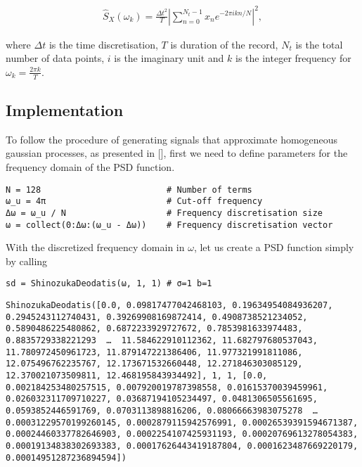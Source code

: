 \begin{equation*}
\begin{split}    \hat{S}_X(\omega_k) = \frac{\Delta t^2}{T} \left| \sum \limits_{n = 0}^{N_t-1} x_n e^{-2 \pi i k n / N} \right|^2,\end{split}\end{equation*}


where \(\Delta t\) is the time discretisation, \(T\) is duration of the record, \(N_t\) is the total number of data points, \(i\) is the imaginary unit and \(k\) is the integer frequency for \(\omega_k = \frac{2 \pi k}{T}\).



\subsection{Implementation}



\label{575251200882559516}{}


To follow the procedure of generating signals that approximate homogeneous gaussian processes, as presented in [], first we need to define parameters for the frequency domain of the PSD function.




\begin{verbatim}
N = 128                         # Number of terms
ω_u = 4π                        # Cut-off frequency
Δω = ω_u / N                    # Frequency discretisation size
ω = collect(0:Δω:(ω_u - Δω))    # Frequency discretisation vector
\end{verbatim}



With the discretized frequency domain in \(\omega\), let us create a PSD function simply by calling




\begin{verbatim}
sd = ShinozukaDeodatis(ω, 1, 1) # σ=1 b=1
\end{verbatim}


\begin{verbatim}
ShinozukaDeodatis([0.0, 0.09817477042468103, 0.19634954084936207, 0.2945243112740431, 0.39269908169872414, 0.4908738521234052, 0.5890486225480862, 0.6872233929727672, 0.7853981633974483, 0.8835729338221293  …  11.584622910112362, 11.682797680537043, 11.780972450961723, 11.879147221386406, 11.977321991811086, 12.075496762235767, 12.173671532660448, 12.271846303085129, 12.370021073509811, 12.468195843934492], 1, 1, [0.0, 0.002184253480257515, 0.007920019787398558, 0.01615370039459961, 0.026032311709710227, 0.03687194105234497, 0.0481306505561695, 0.0593852446591769, 0.0703113898816206, 0.08066663983075278  …  0.00031229570199260145, 0.0002879115942576991, 0.00026539391594671387, 0.00024460337782646903, 0.0002254107425931193, 0.00020769613278054383, 0.00019134838302693383, 0.00017626443419187804, 0.0001623487669220179, 0.00014951287236894594])
\end{verbatim}



